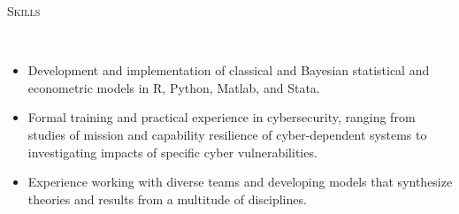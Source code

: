 \documentclass[11pt]{article}
\newenvironment{changemargin}[2]{%
  \begin{list}{}{%
    \setlength{\topsep}{0pt}%
    \setlength{\leftmargin}{#1}%
    \setlength{\rightmargin}{#2}%
    \setlength{\listparindent}{\parindent}%
    \setlength{\itemindent}{\parindent}%
    \setlength{\parsep}{\parskip}%
  }%
  \item[]}{\end{list}
}
\newcommand{\lineover}{
	\begin{changemargin}{-0.05in}{-0.05in}
		\vspace*{-8pt}
		\hrulefill \\
		\vspace*{-2pt}
	\end{changemargin}
}
\newcommand{\header}[1]{
	\begin{changemargin}{-0.5in}{-0.5in}
		\scshape{#1}\\
  	\lineover
	\end{changemargin}
}
\newenvironment{body} {
	\vspace*{-16pt}
	\begin{changemargin}{-0.25in}{-0.5in}
  }	
	{\end{changemargin}
}
\begin{document}
%
%	
%	

\header{Skills}

\begin{body}
	\vspace{14pt}
	\begin{itemize}
		\item Development and implementation of classical and Bayesian statistical and econometric models in R, Python, Matlab, and Stata.
		\item Formal training and practical experience in cybersecurity, ranging from studies of mission and capability resilience of cyber-dependent systems to investigating impacts of specific cyber vulnerabilities.
		\item Experience working with diverse teams and developing models that synthesize theories and results from a multitude of disciplines.
	\end{itemize}
\end{body}
\end{document}
